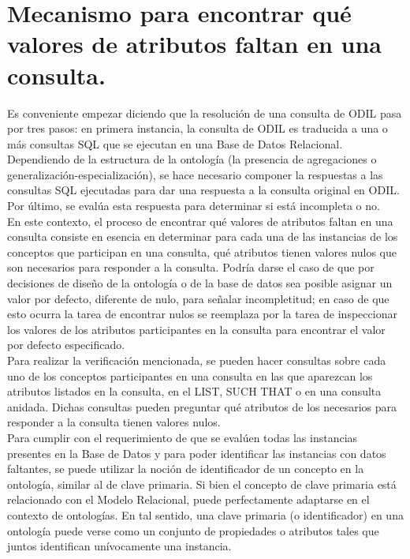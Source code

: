 \section{Mecanismo para encontrar qué valores de atributos faltan en una consulta.}\label{section-mecanismoEncontrarValoresFaltantes}

Es conveniente empezar diciendo que la resolución de una consulta de ODIL pasa por tres pasos: en primera instancia, la consulta de ODIL es traducida a una o más consultas SQL que se ejecutan en una Base de Datos Relacional. Dependiendo de la estructura de la ontología (la presencia de agregaciones o generalización-especialización), se hace necesario componer la respuestas a las consultas SQL ejecutadas para dar una respuesta a la consulta original en ODIL. Por último, se evalúa esta respuesta para determinar si está incompleta o no. \\

En este contexto, el proceso de encontrar qué valores de atributos faltan en una consulta consiste en esencia en determinar para cada una de las instancias de los conceptos que participan en una consulta, qué atributos tienen valores nulos que son necesarios para responder a la consulta. Podría darse el caso de que por decisiones de diseño de la ontología o de la base de datos sea posible asignar un valor por defecto, diferente de nulo, para señalar incompletitud; en caso de que esto ocurra la tarea de encontrar nulos se reemplaza por la tarea de inspeccionar los valores de los atributos participantes en la consulta para encontrar el valor por defecto especificado. \\

Para realizar la verificación mencionada, se pueden hacer consultas sobre cada uno de los conceptos participantes en una consulta en las que aparezcan los atributos listados en la consulta, en el LIST, SUCH THAT o en una consulta anidada. Dichas consultas pueden preguntar qué atributos de los necesarios para responder a la consulta tienen valores nulos.\\

Para cumplir con el requerimiento de que se evalúen todas las instancias presentes en la Base de Datos y para poder identificar las instancias con datos faltantes, se puede utilizar la noción de identificador de un concepto en la ontología, similar al de clave primaria. Si bien el concepto de clave primaria está relacionado con el Modelo Relacional, puede perfectamente adaptarse en el contexto de ontologías. En tal sentido, una clave primaria (o identificador) en una ontología puede verse como un conjunto de propiedades o atributos tales que juntos identifican unívocamente una instancia. \\

